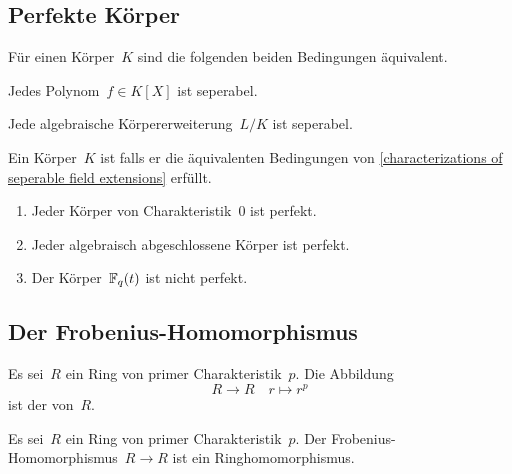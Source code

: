 \subsection{Perfekte Körper}

\begin{proposition}
  \label{characterizations of seperable field extensions}
  Für einen Körper~$K$ sind die folgenden beiden Bedingungen äquivalent.
  \begin{equivlist}
    \item
      Jedes Polynom~$f \in K[X]$ ist seperabel.
    \item
      Jede algebraische Körpererweiterung~$L/K$ ist seperabel.
  \end{equivlist}
\end{proposition}

\begin{definition}
  Ein Körper~$K$ ist  falls er die äquivalenten Bedingungen von \cref{characterizations of seperable field extensions} erfüllt. 
\end{definition}

\begin{example}
  \leavevmode
  \begin{enumerate}
    \item
      Jeder Körper von Charakteristik~$0$ ist perfekt.
    \item
      Jeder algebraisch abgeschlossene Körper ist perfekt.
    \item
      Der Körper~$\mathbb{F}_q(t)$ ist nicht perfekt.
  \end{enumerate}
\end{example}



\subsection{Der Frobenius-Homomorphismus}

\begin{definition}
  Es sei~$R$ ein Ring von primer Charakteristik~$p$.
  Die Abbildung
  \[
    R \to R
    \quad
    r \mapsto r^p
  \]
  ist der  von~$R$.
\end{definition}

\begin{lemma}
  Es sei~$R$ ein Ring von primer Charakteristik~$p$.
  Der Frobenius-\hspace{0pt}Homomorphismus~$R \to R$ ist ein Ringhomomorphismus.
\end{lemma}

